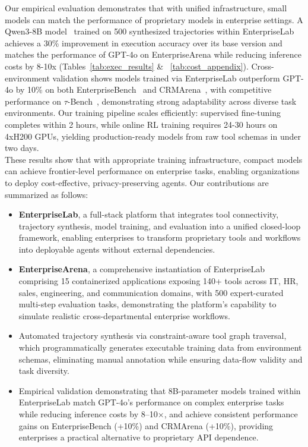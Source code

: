 \documentclass{article}
\theoremstyle{plain}
\theoremstyle{definition}
\theoremstyle{remark}
\begin{document}
Our empirical evaluation demonstrates that with unified infrastructure, small models can match the performance of proprietary models in enterprise settings. A Qwen3-8B model~\cite{yang2025qwen3} trained on 500 synthesized trajectories within EnterpriseLab achieves a 30\% improvement in execution accuracy over its base version and matches the performance of GPT-4o on EnterpriseArena while reducing inference costs by 8-10x (Tables~\ref{tab:exec_results} \& ~\ref{tab:cost_appendix}).  Cross-environment validation shows models trained via EnterpriseLab outperform GPT-4o by 10\% on both EnterpriseBench~\cite{vishwakarma2025can} and CRMArena~\cite{huang2025crmarena}, with competitive performance on $\tau$-Bench~\cite{yao2025tau}, demonstrating  strong adaptability across diverse task environments. Our training pipeline scales efficiently: supervised fine-tuning completes within 2 hours, while online RL training requires 24-30 hours on 4xH200 GPUs, yielding production-ready models from raw tool schemas in under two days. 
\\
\noindent These results show that with appropriate training infrastructure, compact models can achieve frontier-level performance on enterprise tasks, enabling organizations to deploy cost-effective, privacy-preserving agents. Our contributions are summarized as follows:
\vspace{-0.2cm}
\noindent
\begin{itemize}[noitemsep, wide=0pt]
    \item \textbf{EnterpriseLab}, a full-stack platform that integrates tool connectivity, trajectory synthesis, model training, and evaluation into a unified closed-loop framework, enabling enterprises to transform proprietary tools and workflows into deployable agents without external dependencies.
    
    \item \textbf{EnterpriseArena}, a comprehensive instantiation of EnterpriseLab comprising 15 containerized applications exposing 140+ tools across IT, HR, sales, engineering, and communication domains, with 500 expert-curated multi-step evaluation tasks, demonstrating the platform's capability to simulate realistic cross-departmental enterprise workflows.
    
    \item Automated trajectory synthesis via constraint-aware tool graph traversal, which programmatically generates executable training data from environment schemas, eliminating manual annotation while ensuring data-flow validity and task diversity.
    
   \item Empirical validation demonstrating that 8B-parameter models trained within EnterpriseLab match GPT-4o's performance on complex enterprise tasks while reducing inference costs by 8--10$\times$, and achieve consistent performance gains on EnterpriseBench (+10\%) and CRMArena (+10\%), providing enterprises a practical alternative to proprietary API dependence.

\end{itemize}
\end{document}
